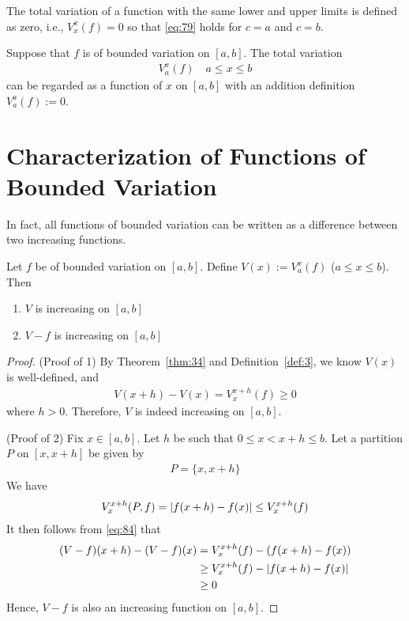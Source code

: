 \documentclass[thmcnt=section, 12pt]{my-elegantbook}
\begin{document}
The total variation of a function with the same lower and upper limits is defined as zero, i.e., $V_x^x(f) = 0$ so that \eqref{eq:79} holds for $c = a$ and $c = b$.

\begin{definition} \label{def:3}
    Suppose that $f$ is of bounded variation on $[a, b]$. The total variation
    \begin{align*}
        V_a^x(f) \quad a \leq x \leq b
    \end{align*}
    can be regarded as a function of $x$ on $[a, b]$ with an addition definition $V_a^a(f) := 0$.
\end{definition}


\section{Characterization of Functions of Bounded Variation}

In fact, all functions of bounded variation can be written as a difference between two increasing functions.


\begin{lemma} \label{lem:2}
    Let $f$ be of bounded variation on $[a, b]$. Define $V(x) := V_a^x(f)$ ($a \leq x \leq b$). Then
    \begin{enumerate}
        \item $V$ is increasing on $[a, b]$
        \item $V-f$ is increasing on $[a, b]$
    \end{enumerate}
\end{lemma}

\begin{proof}
    (Proof of 1) By Theorem~\ref{thm:34} and Definition~\ref{def:3}, we know $V(x)$ is well-defined, and
    \begin{align*}
        V(x+h) - V(x) = V_x^{x+h}(f) \geq 0
    \end{align*}
    where $h > 0$. Therefore, $V$ is indeed increasing on $[a, b]$.

    (Proof of 2) Fix $x \in [a, b]$. Let $h$ be such that $0 \leq x < x+h \leq b$. Let a partition $P$ on $[x, x+h]$ be given by
    \begin{align*}
        P = \{ x, x+h \}
    \end{align*}
    We have
    \begin{align}
        V_x^{x+h}(P, f) = \left\lvert f(x+h) - f(x) \right\rvert
        \leq V_x^{x+h}(f)
        \label{eq:84}
    \end{align}
    It then follows from \eqref{eq:84} that
    \begin{align*}
        (V-f)(x+h) - (V-f)(x)
         & = V_x^{x+h}(f) - (f(x+h) - f(x))        \\
         & \geq V_x^{x+h}(f) - \left\lvert f(x+h) - f(x) \right\rvert \\
         & \geq 0
    \end{align*}
    Hence, $V-f$ is also an increasing function on $[a, b]$.
\end{proof}
\end{document}

